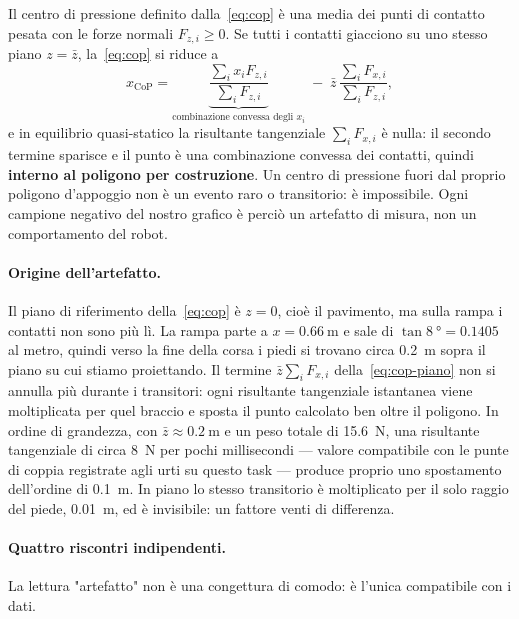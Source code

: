Il centro di pressione definito dalla~\eqref{eq:cop} è una media dei punti di
contatto pesata con le forze normali $F_{z,i} \ge 0$. Se tutti i contatti
giacciono su uno stesso piano $z = \bar{z}$, la~\eqref{eq:cop} si riduce a
\begin{equation}
x_{\mathrm{CoP}} =
\underbrace{\frac{\sum_i x_i F_{z,i}}{\sum_i F_{z,i}}}_{\text{combinazione convessa degli } x_i}
\;-\;
\bar{z}\,\frac{\sum_i F_{x,i}}{\sum_i F_{z,i}} ,
\label{eq:cop-piano}
\end{equation}
e in equilibrio quasi-statico la risultante tangenziale $\sum_i F_{x,i}$ è
nulla: il secondo termine sparisce e il punto è una combinazione convessa dei
contatti, quindi \textbf{interno al poligono per costruzione}. Un centro di
pressione fuori dal proprio poligono d'appoggio non è un evento raro o
transitorio: è impossibile. Ogni campione negativo del nostro grafico è
perciò un artefatto di misura, non un comportamento del robot.

\paragraph{Origine dell'artefatto.} Il piano di riferimento della~\eqref{eq:cop}
è $z = 0$, cioè il pavimento, ma sulla rampa i contatti non sono più lì. La
rampa parte a $x = \SI{0.66}{\meter}$ e sale di $\tan \SI{8}{\degree} = 0.1405$
al metro, quindi verso la fine della corsa i piedi si trovano circa
\SI{0.2}{\meter} sopra il piano su cui stiamo proiettando. Il termine
$\bar{z}\sum_i F_{x,i}$ della~\eqref{eq:cop-piano} non si annulla più durante
i transitori: ogni risultante tangenziale istantanea viene moltiplicata per
quel braccio e sposta il punto calcolato ben oltre il poligono. In ordine di
grandezza, con $\bar{z} \approx \SI{0.2}{\meter}$ e un peso totale di
\SI{15.6}{\newton}, una risultante tangenziale di circa \SI{8}{\newton} per
pochi millisecondi — valore compatibile con le punte di coppia registrate agli
urti su questo task — produce proprio uno spostamento dell'ordine di
\SI{0.1}{\meter}. In piano lo stesso transitorio è moltiplicato per il solo
raggio del piede, \SI{0.01}{\meter}, ed è invisibile: un fattore venti di
differenza.

\paragraph{Quattro riscontri indipendenti.} La lettura "artefatto" non è una
congettura di comodo: è l'unica compatibile con i dati.

